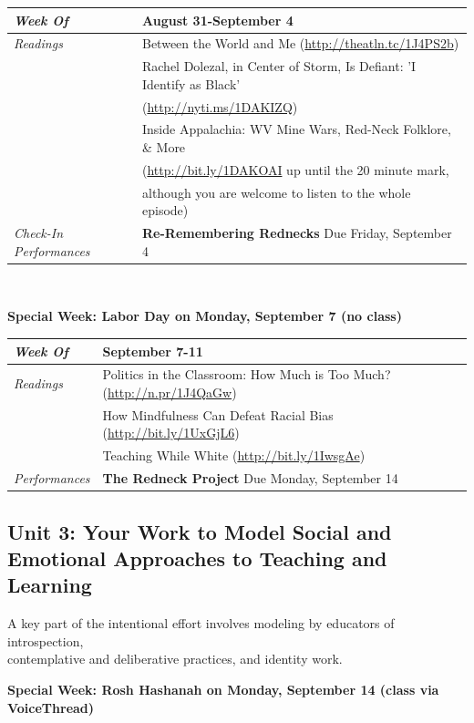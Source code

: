 \documentclass[two-side]{tufte-handout}
\newcommand{\gentopic}[1]{\begin{fullwidth}\begin{center}\faKey \textsf{#1}\end{center}\end{fullwidth}}
\newcommand{\tabread}{\faBook\medspace\textit{Readings}}
\newcommand{\tabperformance}{\faTasks\medspace\textit{Performances}}
\newcommand{\tabdt}{\faCalendar\medspace\textit{Week Of}}
\newcommand{\tabcheckin}{\faCheckSquareO\medspace\textit{Check-In Performances}}
\newcommand{\tabbreak}{\begin{fullwidth}\begin{center}\faAsterisk\faAsterisk\faAsterisk\\\end{center}\end{fullwidth}}
\newcommand{\specialweek}[1]{\begin{fullwidth}\begin{center}\textbf{\faBullhorn\medspace Special Week: #1 \medspace\faBullhorn}\end{center}\end{fullwidth}}
\newenvironment{tabsched}
	{\small
	\begin{tabular}{p{1.5in}p{4.5in}}
	\midrule}
	{\midrule
	\end{tabular}
	\normalsize}
\newcommand{\weekthree}{August 31-September 4}
\newcommand{\weekfour}{September 7-11}
\newcommand{\laborday}{Labor Day on Monday, September 7 (no class)}
\newcommand{\roshhashanah}{Rosh Hashanah on Monday, September 14 (class via VoiceThread)}
\begin{document}
\begin{tabsched}
	\tabdt & \weekthree \\
	\midrule
	\tabread & Between the World and Me (\url{http://theatln.tc/1J4PS2b}) \\
	& Rachel Dolezal, in Center of Storm, Is Defiant: 'I Identify as Black' \\
	& (\url{http://nyti.ms/1DAKIZQ}) \\
	& Inside Appalachia: WV Mine Wars, Red-Neck Folklore, \& More \\
	& (\url{http://bit.ly/1DAKOAI} up until the 20 minute mark, \\
	& although you are welcome to listen to the whole episode) \\
	\midrule
	\tabcheckin & \textbf{Re-Remembering Rednecks} Due Friday, September 4 \\ %
\end{tabsched}

\tabbreak

\specialweek{\laborday}

\begin{tabsched}
	\tabdt & \weekfour \\
	\midrule
	\tabread & Politics in the Classroom: How Much is Too Much? (\url{http://n.pr/1J4QaGw}) \\
	& How Mindfulness Can Defeat Racial Bias (\url{http://bit.ly/1UxGjL6}) \\
	& Teaching While White (\url{http://bit.ly/1IwsgAe})\\
	\midrule
	\tabperformance & \textbf{The Redneck Project} Due Monday, September 14 \\
\end{tabsched}

\begin{fullwidth}
	\section{Unit 3: Your Work to Model Social and Emotional Approaches to Teaching and Learning}
\end{fullwidth}

\gentopic{A key part of the intentional effort involves modeling by educators of introspection,\\contemplative and deliberative practices, and identity work.}

\specialweek{\roshhashanah}
\end{document}
